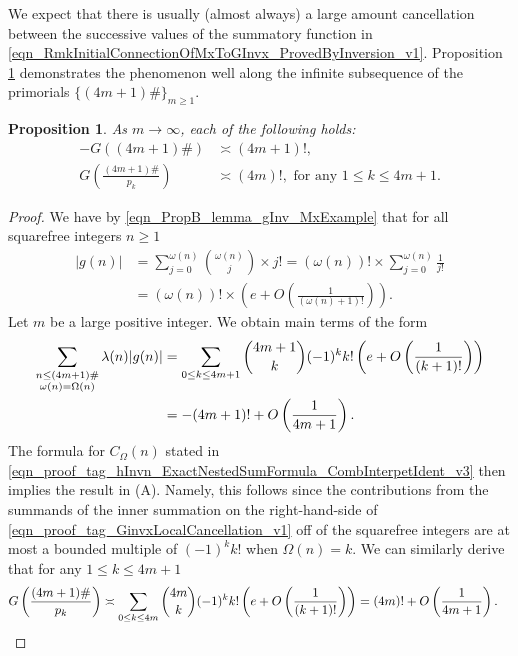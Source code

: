\documentclass[11pt,reqno,a4letter]{article}
\newcommand{\hlocalref}[1]{\hyperref[#1]{\ref{#1}}}
\numberwithin{equation}{section}
\numberwithin{figure}{section}
\numberwithin{table}{section}
\theoremstyle{plain}
\newtheorem{prop}[theorem]{Proposition}
\numberwithin{theorem}{section}
\theoremstyle{definition}
\begin{document}
We expect that there is usually (almost always) 
a large amount cancellation between the successive 
values of the summatory function in 
\eqref{eqn_RmkInitialConnectionOfMxToGInvx_ProvedByInversion_v1}. 
Proposition \hlocalref{theorem_PrimorialSeqGInvCalcs_v1} 
demonstrates the phenomenon well along the infinite 
subsequence of the primorials $\{(4m+1)\#\}_{m \geq 1}$. 

\begin{prop}
\label{theorem_PrimorialSeqGInvCalcs_v1} 
As $m \rightarrow \infty$, each of the following holds: 
\begin{align} 
\tag{A} 
-G((4m+1)\#) & \asymp (4m+1)!, \\ 
\tag{B} 
G\left(\frac{(4m+1)\#}{p_k}\right) & \asymp (4m)!, 
     \text{ for any } 1 \leq k \leq 4m+1. 
\end{align} 
\end{prop}
\begin{proof} 
We have by \eqref{eqn_PropB_lemma_gInv_MxExample} 
that for all squarefree integers $n \geq 1$ 
\begin{align*} 
|g(n)| & = \sum_{j=0}^{\omega(n)} \binom{\omega(n)}{j} \times j! 
     = (\omega(n))! \times \sum_{j=0}^{\omega(n)} \frac{1}{j!} \\ 
     & = (\omega(n))! \times \left(e + O\left(\frac{1}{(\omega(n)+1)!}\right)\right). 
\end{align*} 
Let $m$ be a large positive integer. 
We obtain main terms of the form 
\begin{align} 
\label{eqn_proof_tag_GinvxLocalCancellation_v1} 
\sum_{\substack{n \leq (4m+1)\# \\ \omega(n)=\Omega(n)}} \lambda(n) |g(n)| 
     & = \sum_{0 \leq k \leq 4m+1} \binom{4m+1}{k} (-1)^{k} k! 
     \left(e + O\left(\frac{1}{(k+1)!}\right)\right) \\ 
\notag 
     & = -(4m+1)! + O\left(\frac{1}{4m+1}\right). 
\end{align} 
The formula for $C_{\Omega}(n)$ stated in 
\eqref{eqn_proof_tag_hInvn_ExactNestedSumFormula_CombInterpetIdent_v3} 
then implies the result in (A). 
Namely, this follows since the contributions from the summands of the inner 
summation on the right-hand-side of 
\eqref{eqn_proof_tag_GinvxLocalCancellation_v1} 
off of the squarefree integers 
are at most a bounded multiple of $(-1)^k k!$ when $\Omega(n) = k$. 
We can similarly derive that for any $1 \leq k \leq 4m+1$ 
\begin{align*}
G\left(\frac{(4m+1)\#}{p_k}\right) & \asymp \sum_{0 \leq k \leq 4m} \binom{4m}{k} (-1)^{k} k! 
     \left(e + O\left(\frac{1}{(k+1)!}\right)\right) = (4m)! + O\left(\frac{1}{4m+1}\right). 
     \qedhere 
\end{align*}
\end{proof}
\end{document}
